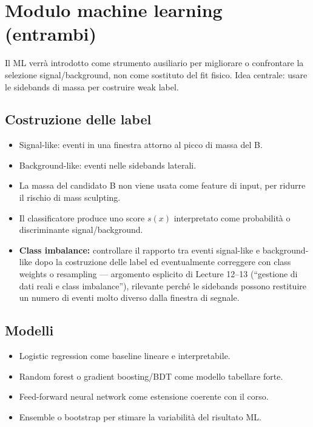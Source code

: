 \documentclass[11pt,a4paper]{article}
\begin{document}
\section{Modulo machine learning \textnormal{\small(entrambi)}}

Il ML verrà introdotto come strumento ausiliario per migliorare o confrontare la selezione signal/background, non come sostituto del fit fisico. Idea centrale: usare le sidebands di massa per costruire weak label.

\subsection*{Costruzione delle label}
\begin{itemize}[leftmargin=1.4em]
    \item Signal-like: eventi in una finestra attorno al picco di massa del B.
    \item Background-like: eventi nelle sidebands laterali.
    \item La massa del candidato B non viene usata come feature di input, per ridurre il rischio di mass sculpting.
    \item Il classificatore produce uno score $s(x)$ interpretato come probabilità o discriminante signal/background.
    \item \textbf{Class imbalance:} controllare il rapporto tra eventi signal-like e background-like dopo la costruzione delle label ed eventualmente correggere con class weights o resampling --- argomento esplicito di Lecture 12--13 (``gestione di dati reali e class imbalance''), rilevante perché le sidebands possono restituire un numero di eventi molto diverso dalla finestra di segnale.
\end{itemize}

\subsection*{Modelli}
\begin{itemize}[leftmargin=1.4em]
    \item Logistic regression come baseline lineare e interpretabile.
    \item Random forest o gradient boosting/BDT come modello tabellare forte.
    \item Feed-forward neural network come estensione coerente con il corso.
    \item Ensemble o bootstrap per stimare la variabilità del risultato ML.
\end{itemize}
\end{document}

